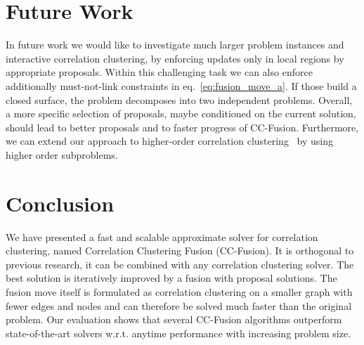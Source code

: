 \documentclass[10pt,twocolumn,letterpaper]{article}
\theoremstyle{definition}
\begin{document}



% 



%


\section{Future Work}\label{sec:future}
In future work we would like to investigate much larger problem instances
and interactive correlation clustering, by enforcing
updates only in local regions by appropriate proposals.
%
Within this challenging task we can also enforce additionally must-not-link constraints in eq.~\ref{eq:fusion_move_a}.
If those build a closed surface, the problem decomposes into two independent problems.
%
Overall, a more specific selection of proposals, maybe conditioned on the current solution,
should lead to better proposals and to faster progress of CC-Fusion.
%
Furthermore, we can extend our approach to higher-order correlation clustering~\cite{Kim-2011,kappes_2013_arxiv}
by using higher order subproblems.


\section{Conclusion}\label{sec:conclusion}

We have presented a fast and scalable 
approximate solver for correlation 
clustering, named Correlation Clustering Fusion (CC-Fusion).
It is orthogonal to previous research, \ie it can be combined with
any correlation clustering solver.
%
The best solution is iteratively improved 
by a fusion with proposal solutions.
The fusion move itself is formulated as correlation
clustering on a smaller graph with fewer edges and nodes
and can therefore be solved much faster than the original problem.
%
Our evaluation shows that several CC-Fusion algorithms
outperform state-of-the-art solvers w.r.t. anytime performance 
with increasing problem size.
\end{document}
